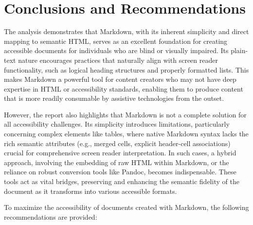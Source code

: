 \section{Conclusions and Recommendations}

The analysis demonstrates that Markdown, with its inherent simplicity and direct mapping to semantic HTML, serves as an excellent foundation for creating accessible documents for individuals who are blind or visually impaired. Its plain-text nature encourages practices that naturally align with screen reader functionality, such as logical heading structures and properly formatted lists. This makes Markdown a powerful tool for content creators who may not have deep expertise in HTML or accessibility standards, enabling them to produce content that is more readily consumable by assistive technologies from the outset.

However, the report also highlights that Markdown is not a complete solution for all accessibility challenges. Its simplicity introduces limitations, particularly concerning complex elements like tables, where native Markdown syntax lacks the rich semantic attributes (e.g., merged cells, explicit header-cell associations) crucial for comprehensive screen reader interpretation. In such cases, a hybrid approach, involving the embedding of raw HTML within Markdown, or the reliance on robust conversion tools like Pandoc, becomes indispensable. These tools act as vital bridges, preserving and enhancing the semantic fidelity of the document as it transforms into various accessible formats.

To maximize the accessibility of documents created with Markdown, the following recommendations are provided:

